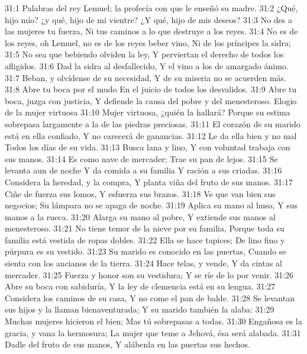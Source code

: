 31:1 Palabras del rey Lemuel; la profecía con que le enseñó su madre.  
31:2 ¿Qué, hijo mío? ¿y qué, hijo de mi vientre?  
¿Y qué, hijo de mis deseos?  
31:3 No des a las mujeres tu fuerza,  
Ni tus caminos a lo que destruye a los reyes.  
31:4 No es de los reyes, oh Lemuel, no es de los reyes beber vino,  
Ni de los príncipes la sidra;  
31:5 No sea que bebiendo olviden la ley,  
Y perviertan el derecho de todos los afligidos.  
31:6 Dad la sidra al desfallecido,  
Y el vino a los de amargado ánimo.  
31:7 Beban, y olvídense de su necesidad,  
Y de su miseria no se acuerden más.  
31:8 Abre tu boca por el mudo  
En el juicio de todos los desvalidos.  
31:9 Abre tu boca, juzga con justicia,  
Y defiende la causa del pobre y del menesteroso.  
Elogio de la mujer virtuosa 
31:10 Mujer virtuosa, ¿quién la hallará?  
Porque su estima sobrepasa largamente a la de las piedras preciosas.  
31:11 El corazón de su marido está en ella confiado,  
Y no carecerá de ganancias.  
31:12 Le da ella bien y no mal  
Todos los días de su vida.  
31:13 Busca lana y lino,  
Y con voluntad trabaja con sus manos.  
31:14 Es como nave de mercader;  
Trae su pan de lejos.  
31:15 Se levanta aun de noche  
Y da comida a su familia  
Y ración a sus criadas.  
31:16 Considera la heredad, y la compra,  
Y planta viña del fruto de sus manos.  
31:17 Ciñe de fuerza sus lomos,  
Y esfuerza sus brazos.  
31:18 Ve que van bien sus negocios;  
Su lámpara no se apaga de noche.  
31:19 Aplica su mano al huso,  
Y sus manos a la rueca.  
31:20 Alarga su mano al pobre,  
Y extiende sus manos al menesteroso.  
31:21 No tiene temor de la nieve por su familia,  
Porque toda su familia está vestida de ropas dobles.  
31:22 Ella se hace tapices;  
De lino fino y púrpura es su vestido.  
31:23 Su marido es conocido en las puertas,  
Cuando se sienta con los ancianos de la tierra.  
31:24 Hace telas, y vende,  
Y da cintas al mercader.  
31:25 Fuerza y honor son su vestidura;  
Y se ríe de lo por venir.  
31:26 Abre su boca con sabiduría, 
Y la ley de clemencia está en su lengua. 
31:27 Considera los caminos de su casa,  
Y no come el pan de balde.  
31:28 Se levantan sus hijos y la llaman bienaventurada; 
Y su marido también la alaba:  
31:29 Muchas mujeres hicieron el bien;  
Mas tú sobrepasas a todas.  
31:30 Engañosa es la gracia, y vana la hermosura;  
La mujer que teme a Jehová, ésa será alabada.  
31:31 Dadle del fruto de sus manos,  
Y alábenla en las puertas sus hechos.


